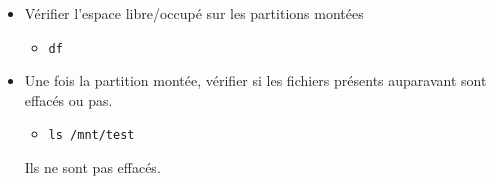 \documentclass[a4paper]{article}
\begin{document}
\begin{itemize}
\item Vérifier l’espace libre/occupé sur les partitions montées
\begin{example}
    \begin{itemize}
        \item \texttt{df}
    \end{itemize}
\end{example}

\item Une fois la partition montée, vérifier si les fichiers présents auparavant sont effacés ou pas.
\begin{example}
    \begin{itemize}
        \item \texttt{ls /mnt/test}
    \end{itemize}
    Ils ne sont pas effacés.
\end{example}


\end{itemize}
\end{document}
